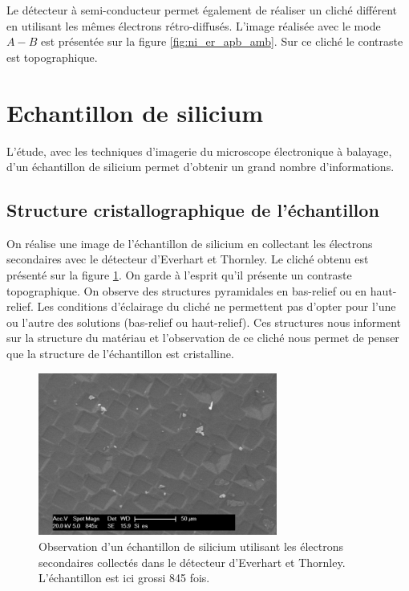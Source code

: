 \documentclass[a4paper,12pt]{article}
\newcommand\ett{Everhart et Thornley\xspace}
\begin{document}
Le détecteur à semi-conducteur permet également de réaliser un cliché différent en utilisant les mêmes électrons
rétro-diffusés. L'image réalisée avec le mode $A-B$ est présentée sur la figure \ref{fig:ni_er_apb_amb}. Sur ce cliché
le contraste est topographique.


 

\section{Echantillon de silicium}

L'étude, avec les techniques d'imagerie du microscope électronique à balayage, d'un échantillon de silicium permet d'obtenir un grand nombre d'informations.

\subsection{Structure cristallographique de l'échantillon}

On réalise une image de l'échantillon de silicium en collectant les électrons secondaires avec le détecteur d'\ett.
Le cliché obtenu est présenté sur la figure \ref{fig:si_es}. On garde à l'esprit qu'il présente un contraste topographique.
On observe des structures pyramidales en bas-relief ou en haut-relief. Les conditions d'éclairage du cliché ne permettent
pas d'opter pour l'une ou l'autre des solutions (bas-relief ou haut-relief). Ces structures nous informent sur la structure
du matériau et l'observation de ce cliché nous permet de penser que la structure de l'échantillon est cristalline.



\begin{figure}
\centering
\includegraphics[width=0.7\textwidth]{images/si_es.png}
\caption{Observation d'un échantillon de silicium utilisant les électrons secondaires collectés dans le détecteur d'\ett. L'échantillon est ici grossi 845 fois.}
\label{fig:si_es}
\end{figure}
\end{document}
